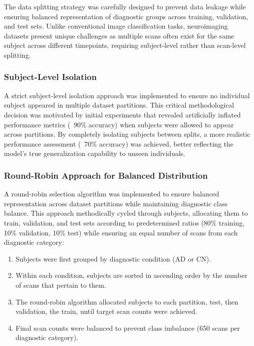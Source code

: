 \documentclass[12pt, a4paper]{article}
\begin{document}
The data splitting strategy was carefully designed to prevent data leakage while ensuring balanced representation of diagnostic groups across training, validation, and test sets. Unlike conventional image classification tasks, neuroimaging datasets present unique challenges as multiple scans often exist for the same subject across different timepoints, requiring subject-level rather than scan-level splitting.

\subsubsection{Subject-Level Isolation}

A strict subject-level isolation approach was implemented to ensure no individual subject appeared in multiple dataset partitions. This critical methodological decision was motivated by initial experiments that revealed artificially inflated performance metrics (~90\% accuracy) when subjects were allowed to appear across partitions. By completely isolating subjects between splits, a more realistic performance assessment (~70\% accuracy) was achieved, better reflecting the model's true generalization capability to unseen individuals.

\subsubsection{Round-Robin Approach for Balanced Distribution}

A round-robin selection algorithm was implemented to ensure balanced representation across dataset partitions while maintaining diagnostic class balance. This approach methodically cycled through subjects, allocating them to train, validation, and test sets according to predetermined ratios (80\% training, 10\% validation, 10\% test) while ensuring an equal number of scans from each diagnostic category:
\begin{enumerate}
    \item Subjects were first grouped by diagnostic condition (AD or CN).
    \item Within each condition, subjects are sorted in ascending order by the number of scans that pertain to them.
    \item The round-robin algorithm allocated subjects to each partition, test, then validation, the train, until target scan counts were achieved.
    \item Final scan counts were balanced to prevent class imbalance (650 scans per diagnostic category).
\end{enumerate}
\end{document}
